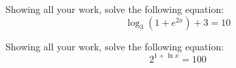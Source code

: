 \documentclass[11pt,letterpaper]{article}
\begin{document}

 Showing all your work, solve the following equation:
	\[
	\log_3 \left(1 + e^{2x} \right) + 3= 10
	\]



\newpage



 Showing all your work, solve the following equation:
	\[
	2^{1 + \ln x}= 100
	\]
\end{document}
